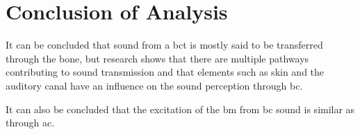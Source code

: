 \section{Conclusion of Analysis}

It can be concluded that sound from a \gls{bct} is mostly said to be transferred through the bone, but research shows that there are multiple pathways contributing to sound transmission and that elements such as skin and the auditory canal have an influence on the sound perception through \gls{bc}. %

It can also be concluded that the excitation of the \gls{bm} from \gls{bc} sound is similar as through \gls{ac}. %



